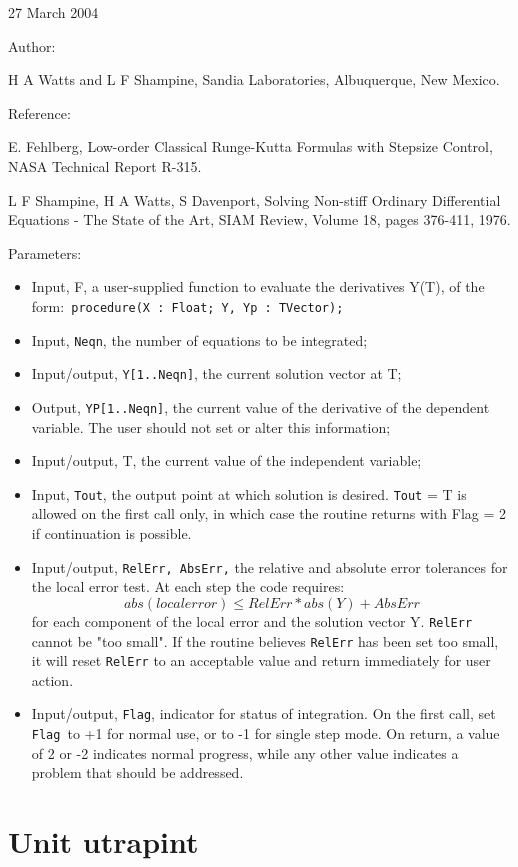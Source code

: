 \documentclass[12pt,a4paper,oneside]{report}
\newcommand{\code}[1]{\texttt{#1}}
\begin{document}
\begin{itemize}
	27 March 2004
	
	Author:
	
	H A Watts and L F Shampine,
	Sandia Laboratories,
	Albuquerque, New Mexico.
	
	Reference:
	
	E. Fehlberg,
	Low-order Classical Runge-Kutta Formulas with Stepsize Control,
	NASA Technical Report R-315.
	
	L F Shampine, H A Watts, S Davenport,
	Solving Non-stiff Ordinary Differential Equations - The State of the Art,
	SIAM Review,
	Volume 18, pages 376-411, 1976.
	
	Parameters: 
	\begin{itemize}
		\item Input, F, a user-supplied function to evaluate the derivatives Y(T), of the form:\code{ procedure(X : Float; Y, Yp : TVector);}
		\item Input, \code{Neqn}, the number of equations to be integrated;
		\item Input/output, \code{Y[1..Neqn]}, the current solution vector at T; 
		\item Output, \code{YP[1..Neqn]}, the current value of the derivative of the dependent variable. The user should not set or alter this information;
		\item Input/output, T, the current value of the independent variable;
		\item Input, \code{Tout}, the output point at which solution is desired. \code{Tout} = T is allowed on the first call only, in which case the routine returns with Flag = 2 if continuation is possible.
		\item Input/output, \code{RelErr, AbsErr,} the relative and absolute error tolerances for the local error test. At each step the code requires: 
		$$abs(local error) \le RelErr * abs(Y) + AbsErr$$ for each component of the local error and the solution vector Y. \code{RelErr} cannot be "too small". If the routine believes \code{RelErr} has been set too small, it will reset \code{RelErr} to an acceptable value and return immediately for user action.
		\item Input/output, \code{Flag}, indicator for status of integration. On the first call, set \code{Flag}\ to +1 for normal use, or to -1 for single step mode. On return, a value of 2 or -2 indicates normal progress, while any other value indicates a problem that should be addressed.
	\end{itemize}
\end{itemize}
\section{Unit utrapint}
\label{utrapint}
\end{document}
